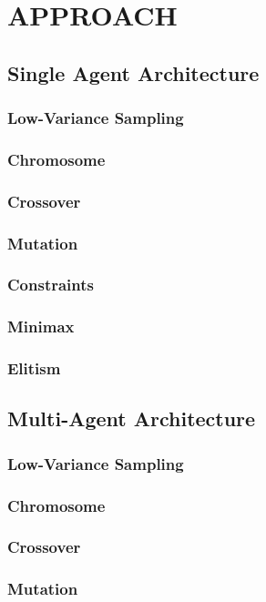 \documentclass[letterpaper, 10 pt, conference]{ieeeconf}  %
\begin{document}
\section{APPROACH}\label{approach}
\subsection{Single Agent Architecture}
\subsubsection{Low-Variance Sampling}
\subsubsection{Chromosome}
\subsubsection{Crossover}
\subsubsection{Mutation}
\subsubsection{Constraints}
\subsubsection{Minimax}
\subsubsection{Elitism}
\subsection{Multi-Agent Architecture}
\subsubsection{Low-Variance Sampling}
\subsubsection{Chromosome}
\subsubsection{Crossover}
\subsubsection{Mutation}
\end{document}
